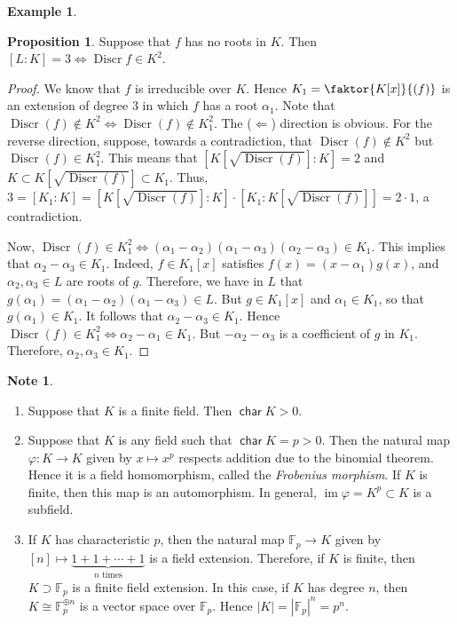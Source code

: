 \documentclass[10pt,letterpaper,cm]{nupset}
\theoremstyle{definition}
\newtheorem{exmp}[definition]{Example}
\newtheorem{note}[definition]{Note}
\theoremstyle{theorem}
\newtheorem{prop}[definition]{Proposition}
\theoremstyle{remark}
\newcommand{\F}{\mathbb F}
\newcommand{\1}{\mathbf{1}}
\newcommand{\0}{\vec 0}
\DeclareMathOperator{\Char}{\mathsf{char}}
\DeclareMathOperator{\im}{im}
\DeclareMathOperator{\disc}{Discr}
\begin{document}
\begin{exmp}
\begin{prop}
Suppose that $f$ has no roots in $K$. Then $[L:K] = 3 \iff \disc{f} \in K^2$.
\end{prop}
\begin{proof}
We know that $f$ is irreducible over $K$. Hence $K_1 = \faktor{K[x]}{(f)}$ is an extension of degree $3$ in which $f$ has a root $\alpha_1$. Note that $\disc(f) \notin K^2 \iff \disc(f) \notin K_1^2$. The ($\Longleftarrow$) direction is obvious. For the reverse direction, suppose, towards a contradiction, that $\disc(f) \notin K^2$ but $\disc(f) \in K_1^2$. This means that $\left[K[\sqrt{\disc(f)}] :K\right] = 2$ and $K\subset K[\sqrt{\disc(f)}] \subset K_1$. Thus, $3 = [K_1 : K] = \left[K[\sqrt{\disc(f)}] : K\right] \cdot \left[K_1 : K[\sqrt{\disc(f)}]\right] = 2 \cdot 1$, a contradiction. 

\medskip


Now, $\disc(f) \in K_1^2 \iff (\alpha_1 - \alpha_2) ( \alpha_1 - \alpha_3)(\alpha_2 - \alpha_3) \in K_1$. This implies that $\alpha_2 - \alpha_3 \in K_1$. Indeed, $f\in K_1[x]$ satisfies $f(x) = (x-\alpha_1)g(x)$, and $\alpha_2, \alpha_3 \in L$ are roots of $g$. Therefore, we have in $L$ that $g(\alpha_1) = (\alpha_1 - \alpha_2)(\alpha_1 - \alpha_3) \in L$. But $g\in K_1[x]$ and $\alpha_1 \in K_1$, so that $g(\alpha_1) \in K_1$. It follows that $\alpha_2 - \alpha_3 \in K_1$. Hence $\disc(f) \in K_1^2 \iff \alpha_2 - \alpha_1 \in K_1$. But $-\alpha_2 -\alpha_3$ is a coefficient of $g$ in $K_1$. Therefore, $\alpha_2, \alpha_3 \in K_1$. 
\end{proof}
\end{exmp}

\smallskip

\begin{note} $ $
\begin{enumerate}
\item Suppose that $K$ is a finite field. Then $\Char{K}>0$. 
\item Suppose that $K$ is any field such that $\Char{K} = p>0$. Then the natural map $\varphi : K \to K$ given by $x \mapsto x^p$ respects addition due to the binomial theorem. Hence it is a field homomorphism, called the \textit{Frobenius morphism}. If $K$ is finite, then this map is an automorphism. In general, $\im{\varphi} =K^p \subset K$ is a subfield. 
\item If $K$ has characteristic $p$, then the natural map $\F_p \to K$ given by $[n] \mapsto \underbrace{1 + 1 +\cdots +1}_{n \text{ times}}$ is a field extension. Therefore, if $K$ is finite, then $K\supset \F_p$ is a finite field extension. In this case, if $K$ has degree $n$, then $K \cong  \F_p^{\oplus n}$ is a vector space over $\F_p$. Hence $\left\lvert{K}\right\rvert = \left\lvert{\F_p}\right\rvert^n = p^n$. 
\end{enumerate}
\end{note}
\end{document}
